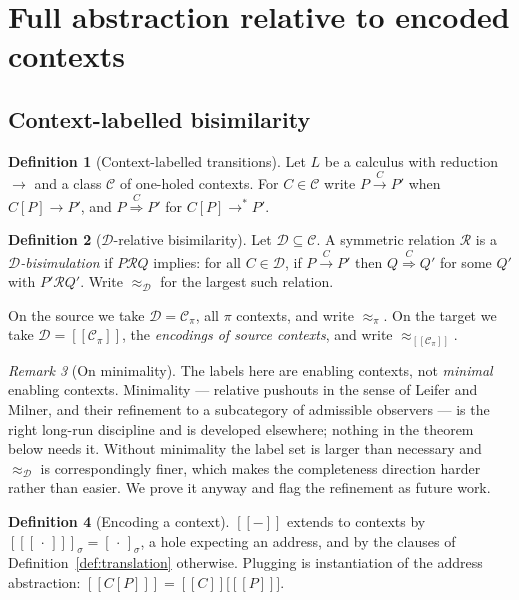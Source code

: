 \documentclass[11pt]{article}
\theoremstyle{definition}
\newtheorem{definition}{Definition}[section]
\theoremstyle{plain}
\theoremstyle{remark}
\newtheorem{remark}[definition]{Remark}
\newcommand{\enc}[1]{[\![#1]\!]}
\newcommand{\Ctx}{\mathscr{C}}
\newcommand{\Obs}{\mathcal{D}}
\newcommand{\bisim}{\approx}
\providecommand{\xLongrightarrow}[1]{\mathrel{\overset{#1}{\Longrightarrow}}}
\begin{document}
\section{Full abstraction relative to encoded contexts}\label{sec:fullabs}

\subsection{Context-labelled bisimilarity}

\begin{definition}[Context-labelled transitions]
Let $L$ be a calculus with reduction $\to$ and a class $\Ctx$ of
one-holed contexts. For $C \in \Ctx$ write
$P \xrightarrow{\,C\,} P'$ when $C[P] \to P'$, and
$P \xLongrightarrow{\,C\,} P'$ for $C[P] \to^* P'$.
\end{definition}

\begin{definition}[$\Obs$-relative bisimilarity]\label{def:dbisim}
Let $\Obs \subseteq \Ctx$. A symmetric relation $\mathcal{R}$ is a
\emph{$\Obs$-bisimulation} if $P \mathrel{\mathcal{R}} Q$ implies: for all
$C \in \Obs$, if $P \xrightarrow{\,C\,} P'$ then
$Q \xLongrightarrow{\,C\,} Q'$ for some $Q'$ with
$P' \mathrel{\mathcal{R}} Q'$. Write $\bisim_\Obs$ for the largest such
relation.
\end{definition}

On the source we take $\Obs = \Ctx_\pi$, all $\pi$ contexts, and write
$\bisim_\pi$. On the target we take $\Obs = \enc{\Ctx_\pi}$, the
\emph{encodings of source contexts}, and write $\bisim_{\enc{\Ctx_\pi}}$.

\begin{remark}[On minimality]\label{rem:minimality}
The labels here are enabling contexts, not \emph{minimal} enabling
contexts. Minimality --- relative pushouts in the sense of Leifer and
Milner, and their refinement to a subcategory of admissible observers ---
is the right long-run discipline and is developed elsewhere; nothing in
the theorem below needs it. Without minimality the label set is larger
than necessary and $\bisim_\Obs$ is correspondingly finer, which makes the
completeness direction harder rather than easier. We prove it anyway and
flag the refinement as future work.
\end{remark}

\begin{definition}[Encoding a context]
$\enc{-}$ extends to contexts by
$\enc{[\,\cdot\,]}_\sigma = [\,\cdot\,]_\sigma$, a hole expecting an
address, and by the clauses of Definition~\ref{def:translation} otherwise.
Plugging is instantiation of the address abstraction:
$\enc{C[P]} = \enc{C}\big[\enc{P}\big]$.
\end{definition}
\end{document}

